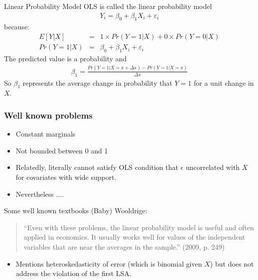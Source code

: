 \begin{frame}{Linear Probability Model}
       OLS is called the \alert{linear probability model} 
       \begin{eqnarray*}
       Y_i  = \beta_0 + \beta_1 X_i + \varepsilon_i 
       \end{eqnarray*}
       because:
       \begin{eqnarray*}
       E[Y | X] &=& 1 \times Pr(Y=1 | X) + 0 \times Pr(Y=0  | X) \\
       Pr(Y=1 | X) &=& \beta_0 + \beta_1 X_i + \varepsilon_i
       \end{eqnarray*}
       The predicted value is a \alert{probability} and 
       \begin{eqnarray*}
       \beta_1 = \frac{Pr(Y=1 | X =x+\Delta x) - Pr(Y=1 | X=x)}{\Delta x}
       \end{eqnarray*}
       So $\beta_1$ represents the average change in probability that $Y=1$ for a unit change in $X$.
\end{frame}

\begin{frame}
       \frametitle{Well known problems}
       \begin{itemize}
       \item Constant marginals 
       \item Not bounded between 0 and 1
       \item Relatedly, literally cannot satisfy OLS condition that $\epsilon$ uncorrelated with $X$ for covariates with wide support. 
       \item Nevertheless .... 
       \end{itemize}
\end{frame}

\begin{frame}{Some well known textbooks}
(Baby) Wooldrige:
\begin{quote}
``Even with these problems, the linear probability model is useful and often applied in economics. It usually works well for values of the independent variables that are near the averages in the sample.'' (2009, p. 249)
\end{quote}
\begin{itemize}
\item Mentions heteroskedasticity of error (which is binomial given $X$) but does not address the violation of the first LSA.
\end{itemize}
\end{frame}

